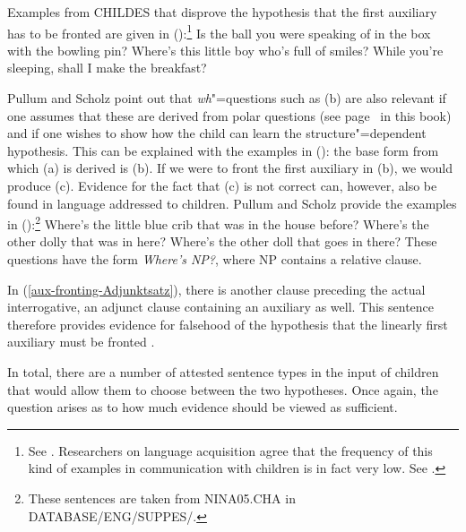 Examples from CHILDES that disprove the hypothesis that the first auxiliary has to be fronted are given in ():\footnote{%
  See . Researchers on language acquisition agree that the frequency of this kind of examples in communication with children is in fact
  very low. See .
}
\eal
\label{aux-fronting-childes}
\ex Is the ball you were speaking of in the box with the bowling pin?
\ex Where's this little boy who's full of smiles?
\ex\label{aux-fronting-Adjunktsatz} While you're sleeping, shall I make the breakfast?
\zl

\noindent
Pullum and Scholz point out that \emph{wh}"=questions such as (b) are also relevant if one assumes that these are derived from
polar questions (see page~\pageref{Seite-GB-Entscheidungsfragen-Englisch} in this book) and if one wishes to show how the child can
learn the structure"=dependent hypothesis. This can be explained with the examples in (): the
base form from which (a) is derived is (b). If we were to front the first auxiliary in (b), we would produce (c).
\eal
{}
\zl
Evidence for the fact that (c) is not correct can, however, also be found in language addressed to children.
Pullum and Scholz provide the examples in ():\footnote{%
	These sentences are taken from NINA05.CHA in DATABASE/ENG/SUPPES/.
}
\eal
\label{wh-Fragen-Hilfsverbinversion}
\ex Where's the little blue crib that was in the house before?
\ex Where's the other dolly that was in here?
\ex Where's the other doll that goes in there?
\zl
These questions have the form \emph{Where's NP?}, where NP contains a relative clause.

In (\ref{aux-fronting-Adjunktsatz}), there is another clause preceding the actual interrogative, an adjunct clause containing an
auxiliary as well. This sentence therefore provides evidence for falsehood of the hypothesis that the linearly first auxiliary must be fronted
\citep[]{Sampson89a}. 

In total, there are a number of attested sentence types in the input of children that would allow them to choose between the two
hypotheses. Once again, the question arises as to how much evidence should be viewed as sufficient.

